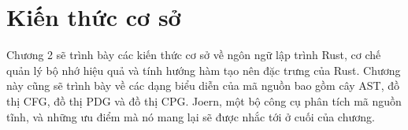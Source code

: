 \chapter{Kiến thức cơ sở}
\label{chap:background}

Chương 2 sẽ trình bày các kiến thức cơ sở về ngôn ngữ lập trình Rust, cơ chế quản lý bộ nhớ hiệu quả và tính hướng hàm tạo nên đặc trưng của Rust.
Chương này cũng sẽ trình bày về các dạng biểu diễn của mã nguồn bao gồm cây AST, đồ thị CFG, đồ thị PDG và đồ thị CPG.
Joern, một bộ công cụ phân tích mã nguồn tĩnh, và những ưu điểm mà nó mang lại sẽ được nhắc tới ở cuối của chương.




